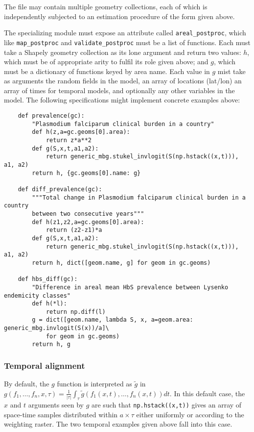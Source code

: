 The file may contain multiple geometry collections, each of which is independently subjected to an estimation procedure of the form given above. 

The specializing module must expose an attribute called \texttt{areal\_postproc}, which like \texttt{map\_postproc} and \texttt{validate\_postproc} must be a list of functions. Each must take a Shapely geometry collection as its lone argument and return two values: $h$, which must be of appropriate arity to fulfil its role given above; and $g$, which must be a dictionary of functions keyed by area name. Each value in $g$ mist take as arguments the random fields in the model, an array of locations (lat/lon) an array of times for temporal models, and optionally any other variables in the model. The following specifications might implement concrete examples above:
\begin{verbatim}
    def prevalence(gc):
        "Plasmodium falciparum clinical burden in a country"
        def h(z,a=gc.geoms[0].area):
            return z*a**2
        def g(S,x,t,a1,a2):
            return generic_mbg.stukel_invlogit(S(np.hstack((x,t))), a1, a2)
        return h, {gc.geoms[0].name: g}
    
    def diff_prevalence(gc):
        """Total change in Plasmodium falciparum clinical burden in a country 
        between two consecutive years"""
        def h(z1,z2,a=gc.geoms[0].area):
            return (z2-z1)*a
        def g(S,x,t,a1,a2):
            return generic_mbg.stukel_invlogit(S(np.hstack((x,t))), a1, a2)
        return h, dict([geom.name, g] for geom in gc.geoms)
    
    def hbs_diff(gc):
        "Difference in areal mean HbS prevalence between Lysenko endemicity classes"
        def h(*l):
            return np.diff(l)
        g = dict([geom.name, lambda S, x, a=geom.area: generic_mbg.invlogit(S(x))/a]\
            for geom in gc.geoms)
        return h, g
\end{verbatim}

\subsubsection{Temporal alignment}
By default, the $g$ function is interpreted as $\tilde g$ in $g(f_1,\ldots,f_n,x,\tau)=\frac{1}{|\tau|}\int_\tau \tilde g(f_1(x,t),\ldots,f_n(x,t))dt$. In this default case, the $x$ and $t$ arguments seen by $g$ are such that \texttt{np.hstack((x,t))} gives an array of space-time samples distributed within $a\times\tau$ either uniformly or according to the weighting raster. The two temporal examples given above fall into this case.

